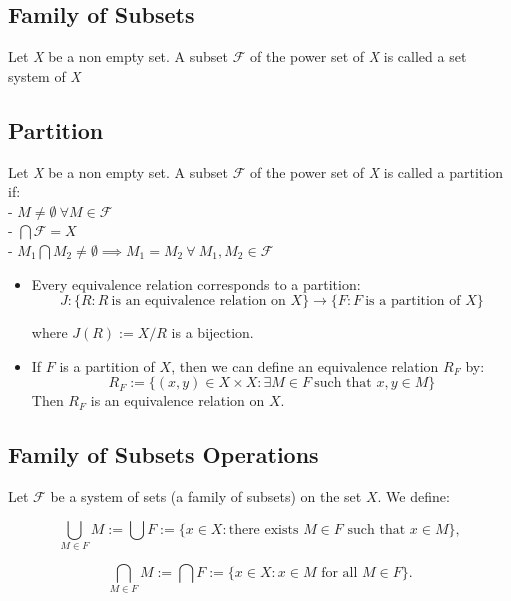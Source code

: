 \subsection{Family of Subsets}
Let \emph{X} be a non empty set. A subset \(\mathscr{F}\) of the power set of \textit{X} is called a set system of \textit{X}

\subsection{Partition}
Let \emph{X} be a non empty set. A subset \(\mathscr{F}\) of the power set of \textit{X} is called a partition if:\\
- \(M \neq  \emptyset\ \forall M \in \mathscr{F}\)\\
- \(\bigcap \mathscr{F} = X\)\\
- \(M_1 \bigcap M_2 \ne \emptyset \implies M_1 = M_2\ \forall\ M_1, M_2 \in \mathscr{F} \)

\begin{itemize}[label=\(-\)]

	\item Every equivalence relation corresponds to a partition:
	      \[
		      J: \{ R : R\ \text{is an equivalence relation on } X\} \to \{ F: F\ \text{is a partition of } X\}
	      \]

	      where \( J(R) := X / R \) is a bijection.

	\item If \( F \) is a partition of \( X \), then we can define an equivalence relation \( R_F \) by:
	      \[
		      R_F := \{ (x, y) \in X \times X : \exists M \in F\ \text{such that } x, y \in M \}
	      \]
	      Then \( R_F \) is an equivalence relation on \( X \).

\end{itemize}


\subsection{Family of Subsets Operations}
Let \(\mathscr{F}\) be a system of sets (a family of subsets) on the set \( X \). We define:

\[
	\bigcup_{M \in F} M := \bigcup F := \{ x \in X : \text{there exists } M \in F \text{ such that } x \in M \} ,
\]

\[
	\bigcap_{M \in F} M := \bigcap F := \{ x \in X : x \in M \text{ for all } M \in F \} .
\]